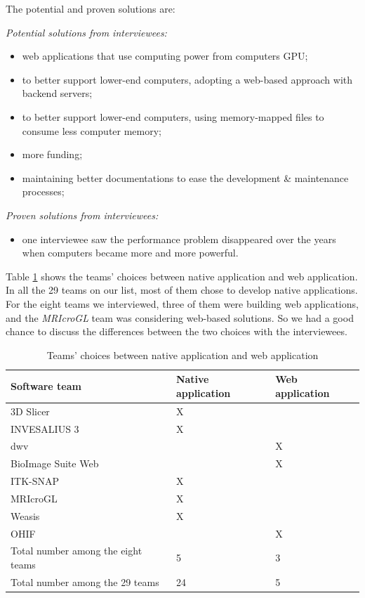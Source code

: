 \documentclass[3p, 12pt,authoryear]{elsarticle}
\begin{document}
The potential and proven solutions are:

\noindent\textit{Potential solutions from interviewees:}

\begin{itemize}
\item web applications that use computing power from computers GPU;
\item to better support lower-end computers, adopting a web-based approach with backend servers;
\item to better support lower-end computers, using memory-mapped files to
consume less computer memory;
\item more funding;
\item maintaining better documentations to ease the development \& maintenance
processes;
\end{itemize}

\noindent\textit{Proven solutions from interviewees:}

\begin{itemize}
\item one interviewee saw the performance problem disappeared over the years
when computers became more and more powerful. 
\end{itemize}

Table \ref{tab_native_vs_web} shows the teams' choices between native
application and web application. In all the 29 teams on our list, most of them
chose to develop native applications. For the eight teams we interviewed, three
of them were building web applications, and the \textit{MRIcroGL} team was
considering web-based solutions. So we had a good chance to discuss the
differences between the two choices with the interviewees.

\begin{table}[ht]
\centering
\begin{tabular}{lll}
\hline
Software team & Native application & Web application \\ \hline
3D Slicer & X & \\
INVESALIUS 3 & X & \\
dwv & & X \\
BioImage Suite Web & & X \\
ITK-SNAP & X & \\
MRIcroGL & X & \\
Weasis & X & \\
OHIF & & X \\ \hdashline
Total number among the eight teams & 5 & 3 \\
Total number among the 29 teams & 24 & 5 \\ \hline
\end{tabular}
\caption{\label{tab_native_vs_web}Teams' choices between native application and
web application}
\end{table}
\end{document}
